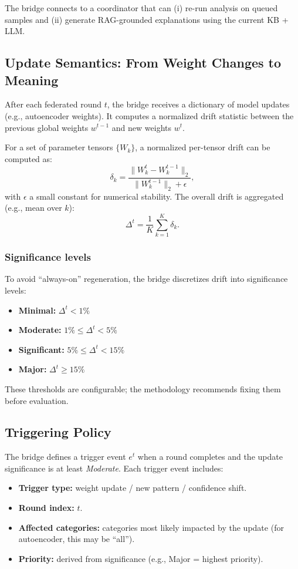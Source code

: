 The bridge connects to a coordinator that can (i) re-run analysis on queued samples and (ii) generate RAG-grounded explanations using the current KB + LLM.

\subsection{Update Semantics: From Weight Changes to Meaning}
\label{sec:update-semantics}

After each federated round $t$, the bridge receives a dictionary of model updates (e.g., autoencoder weights). It computes a normalized drift statistic between the previous global weights $w^{t-1}$ and new weights $w^{t}$.

For a set of parameter tensors $\{W_k\}$, a normalized per-tensor drift can be computed as:
\begin{equation}
\delta_k = \frac{\lVert W_k^{t} - W_k^{t-1} \rVert_2}{\lVert W_k^{t-1} \rVert_2 + \epsilon},
\end{equation}
with $\epsilon$ a small constant for numerical stability. The overall drift is aggregated (e.g., mean over $k$):
\begin{equation}
\Delta^{t} = \frac{1}{K}\sum_{k=1}^{K} \delta_k.
\end{equation}

\subsubsection{Significance levels}
To avoid ``always-on'' regeneration, the bridge discretizes drift into significance levels:
\begin{itemize}
  \item \textbf{Minimal:} $\Delta^{t} < 1\%$
  \item \textbf{Moderate:} $1\% \le \Delta^{t} < 5\%$
  \item \textbf{Significant:} $5\% \le \Delta^{t} < 15\%$
  \item \textbf{Major:} $\Delta^{t} \ge 15\%$
\end{itemize}
These thresholds are configurable; the methodology recommends fixing them before evaluation.

\subsection{Triggering Policy}
\label{sec:trigger-policy}

The bridge defines a trigger event $e^{t}$ when a round completes and the update significance is at least \emph{Moderate}. Each trigger event includes:
\begin{itemize}
  \item \textbf{Trigger type:} weight update / new pattern / confidence shift.
  \item \textbf{Round index:} $t$.
  \item \textbf{Affected categories:} categories most likely impacted by the update (for autoencoder, this may be ``all'').
  \item \textbf{Priority:} derived from significance (e.g., Major = highest priority).
\end{itemize}

